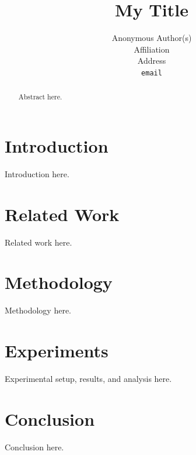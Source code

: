 \documentclass{article}
\title{My Title}
\author{Anonymous Author(s)\\
Affiliation\\
Address\\
\texttt{email}
}
\begin{document}
\maketitle

\begin{abstract}
Abstract here.
\end{abstract}

\section{Introduction}
\label{sec:intro}
Introduction here.

\section{Related Work}
\label{sec:related_work}
Related work here.

\section{Methodology}
\label{sec:method}
Methodology here.

\section{Experiments}
\label{sec:experiments}
Experimental setup, results, and analysis here.

\section{Conclusion}
\label{sec:conclusion}
Conclusion here.




\end{document}
